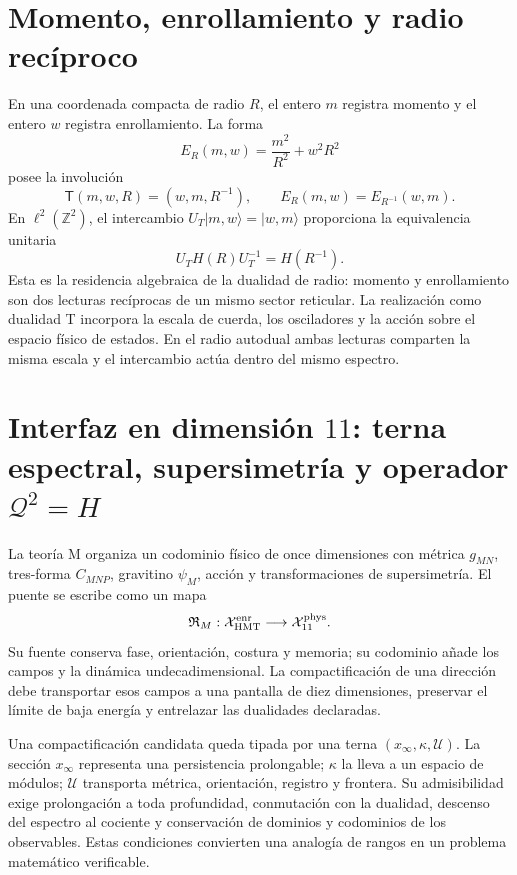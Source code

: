 \section{Momento, enrollamiento y radio recíproco}

En una coordenada compacta de radio \(R\), el entero \(m\) registra momento y
el entero \(w\) registra enrollamiento. La forma
\[
 E_R(m,w)=\frac{m^2}{R^2}+w^2R^2
\]
posee la involución
\[
 \mathsf T(m,w,R)=(w,m,R^{-1}),
 \qquad
 E_R(m,w)=E_{R^{-1}}(w,m).
\]
En \(\ell^2(\mathbb Z^2)\), el intercambio
\(U_T\lvert m,w\rangle=\lvert w,m\rangle\) proporciona la equivalencia
unitaria
\[
 U_TH(R)U_T^{-1}=H(R^{-1}).
\]
Esta es la residencia algebraica de la dualidad de radio: momento y
enrollamiento son dos lecturas recíprocas de un mismo sector reticular. La
realización como dualidad T incorpora la escala de cuerda, los osciladores y
la acción sobre el espacio físico de estados. En el radio autodual ambas
lecturas comparten la misma escala y el intercambio actúa dentro del mismo
espectro.

\section{Interfaz en dimensión \(11\): terna espectral, supersimetría y operador \(\mathcal Q^2=H\)}

La teoría M organiza un codominio físico de once dimensiones con métrica
\(g_{MN}\), tres-forma \(C_{MNP}\), gravitino \(\psi_M\), acción y
transformaciones de supersimetría. El puente se escribe como un mapa
\[
 \mathfrak R_M:\mathcal X_{\rm HMT}^{\rm enr}
 \longrightarrow\mathcal X_{11}^{\rm phys}.
\]
Su fuente conserva fase, orientación, costura y memoria; su codominio añade
los campos y la dinámica undecadimensional. La compactificación de una
dirección debe transportar esos campos a una pantalla de diez dimensiones,
preservar el límite de baja energía y entrelazar las dualidades declaradas.

Una compactificación candidata queda tipada por una terna
\((x_\infty,\kappa,\mathcal U)\). La sección \(x_\infty\) representa una
persistencia prolongable; \(\kappa\) la lleva a un espacio de módulos;
\(\mathcal U\) transporta métrica, orientación, registro y frontera. Su
admisibilidad exige prolongación a toda profundidad, conmutación con la
dualidad, descenso del espectro al cociente y conservación de dominios y
codominios de los observables. Estas condiciones convierten una analogía de
rangos en un problema matemático verificable.

